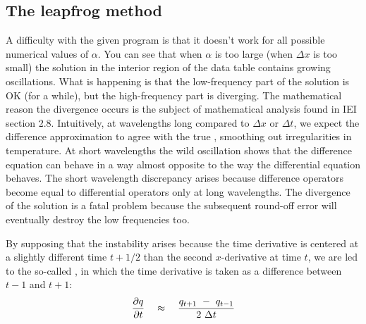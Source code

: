\subsection{The leapfrog method}
\par
A difficulty with the given program is that it doesn't work for all 
possible numerical values of  $\alpha$.
You can see that when  $\alpha$  is too large (when $  \Delta x $  is 
too small) 
the solution in the interior region of the data table
contains growing oscillations.
What is happening is that the low-frequency part of the solution
is OK (for a while), but the high-frequency part is diverging.
The mathematical reason the divergence occurs
is the subject of mathematical analysis
found in IEI section 2.8.
Intuitively, at wavelengths long compared
to  $\Delta x $  or  $\Delta t $,
we expect the difference approximation to agree with the true
,
smoothing out irregularities in temperature.
At short wavelengths the wild oscillation shows
that the difference equation
can behave in a way almost opposite
to the way the differential equation behaves.
The short wavelength discrepancy arises because difference operators
become equal to differential operators only at long wavelengths.
The divergence of the solution is a fatal problem because the subsequent
round-off error will eventually destroy the low frequencies too.
\par
By supposing that the instability arises because the time derivative
is centered at a slightly different time  $t+1/2$  than
the second  $x$-derivative at time  $t$,
we are led to the so-called 
{\em  {}},
in which the time derivative is taken as a difference
between  $t-1$  and  $t+1$:
\begin{equation}
{ \partial q   \over  \partial t } \quad \approx \quad
{ q_{{t+1}}\ -\ q_{{t-1}}   \over  2\  \Delta t }
\label{eqn:two10}
\end{equation}
